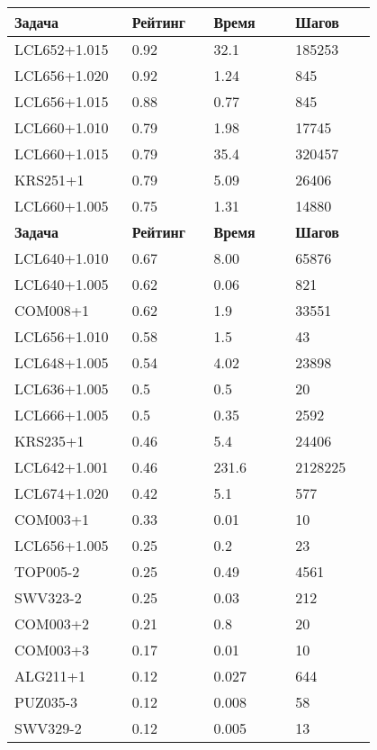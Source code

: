 \begin{longtable}[H]{|p{0.2\linewidth}|p{0.2\linewidth}|p{0.2\linewidth}|p{0.2\linewidth}|}
\hline
\textbf{Задача} & \textbf{Рейтинг} & \textbf{Время} & \textbf{Шагов} \\
\hline 
LCL652+1.015 & 0.92 & 32.1 & 185253 \\
\hline
LCL656+1.020 & 0.92 & 1.24 & 845 \\
\hline
LCL656+1.015 & 0.88 & 0.77 & 845 \\
\hline
LCL660+1.010 & 0.79 & 1.98 & 17745 \\
\hline
LCL660+1.015 & 0.79 & 35.4 & 320457 \\
\hline
KRS251+1 & 0.79 & 5.09 & 26406 \\
\hline
LCL660+1.005 & 0.75 & 1.31 & 14880 \\
\hline
\textbf{Задача} & \textbf{Рейтинг} & \textbf{Время} & \textbf{Шагов} \\
\hline
LCL640+1.010 & 0.67 & 8.00 & 65876 \\
\hline
LCL640+1.005 &  0.62 &  0.06 &  821 \\
\hline
COM008+1 & 0.62 & 1.9 & 33551 \\
\hline
LCL656+1.010 &  0.58 &  1.5 &  43 \\
\hline
LCL648+1.005 &  0.54 &  4.02 &  23898 \\
\hline
LCL636+1.005 &  0.5 &  0.5 &  20 \\
\hline
LCL666+1.005 &  0.5 &  0.35 &  2592 \\
\hline
KRS235+1 & 0.46 & 5.4 & 24406 \\
\hline
LCL642+1.001 & 0.46 & 231.6 & 2128225 \\
\hline
LCL674+1.020 &  0.42 &  5.1 &  577 \\
\hline
COM003+1 &  0.33 &  0.01 &  10 \\
\hline
LCL656+1.005 &  0.25 &  0.2 &  23 \\
\hline
TOP005-2 & 0.25 & 0.49 & 4561 \\
\hline
SWV323-2 & 0.25 & 0.03 & 212 \\
\hline
COM003+2 &  0.21 &  0.8 &  20 \\
\hline
COM003+3 &  0.17 &  0.01 &  10 \\
\hline
ALG211+1 &  0.12 &  0.027 &  644 \\
\hline
PUZ035-3 & 0.12 & 0.008 & 58 \\
\hline
SWV329-2 & 0.12 & 0.005 & 13 \\

\end{longtable}
